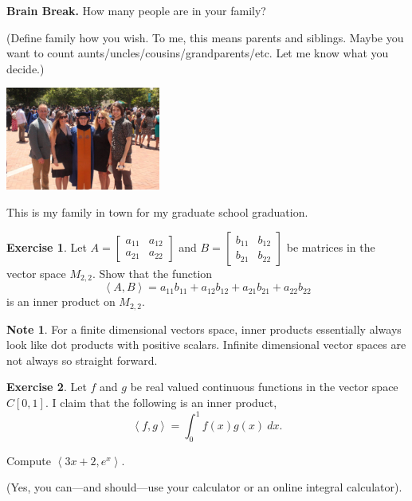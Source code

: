 \documentclass{beamer}
\newcommand{\fn}{\insertframenumber}
\newcommand{\ip}[2]{\left\langle #1,#2\right\rangle}
\theoremstyle{definition}
\newtheorem{exercise}{Exercise}
\newtheorem*{nb}{Note}
\begin{document}
\begin{frame}{\fn}
	\begin{block}{\textbf{Brain Break.}}
		How many people are in your family? 
		
		(Define family how you wish. To me, this means parents and siblings.  Maybe you want to count aunts/uncles/cousins/grandparents/etc. Let me know what you decide.)
		
		\begin{center}
			\includegraphics[width=2in]{../images/emory_grad}
			
			This is my family in town for my graduate school graduation.
		\end{center}
	
		
	\end{block}
\end{frame}
\begin{frame}{\fn}
	\begin{exercise}\label{MatInnerProd}
		Let $A=\begin{bmatrix} a_{11}&a_{12}\\a_{21}&a_{22}\end{bmatrix}$ and $B=\begin{bmatrix}b_{11}&b_{12}\\b_{21}&b_{22}\end{bmatrix}$ be matrices in the vector space $M_{2,2}$.  Show that the function
			\[\ip{A}{B}=a_{11}b_{11}+a_{12}b_{12}+a_{21}b_{21}+a_{22}b_{22}\]
		is an inner product on $M_{2,2}$.
	\end{exercise}
	\begin{nb}
		For a finite dimensional vectors space, inner products essentially always look like dot products with positive scalars.  Infinite dimensional vector spaces are not always so straight forward.
	\end{nb}
\end{frame}
\begin{frame}{\fn}
	\begin{exercise}
		Let $f$ and $g$ be real valued continuous functions in the vector space $C[0,1]$.  I claim that the following is an inner product,\[\ip{f}{g}=\int_0^1 f(x)g(x)\ dx.\]
		
		Compute $\ip{3x+2}{e^x}$. 
		
		(Yes, you can---and should---use your calculator or an online integral calculator).
	\end{exercise}
\end{frame}
\end{document}
